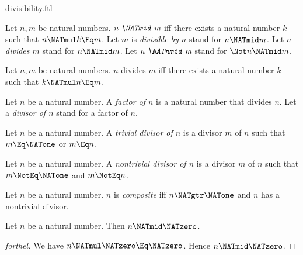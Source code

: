 \documentclass{stex}
\begin{document}
\begin{smodule}{divisibility.ftl}

\begin{definition}[forthel,for={divisible,divide}]
  Let $n, m$ be natural numbers.
  $\emph{n \NATmid m}$ iff there exists a natural number $k$ such that $n \NATmul k \Eq m$.
  Let $m$ is \emph{divisible by $n$} stand for $n \NATmid m$.
  Let $n$ \emph{divides $m$} stand for $n \NATmid m$.
  Let $\emph{n \NATnmid m}$ stand for $\Not n \NATmid m$.
\end{definition}

\begin{lemma}[forthel]
  Let $n, m$ be natural numbers.
  $n$ divides $m$ iff there exists a natural number $k$ such that $k \NATmul n \Eq m$.
\end{lemma}

\begin{definition}[forthel,for={factor,divisor}]
  Let $n$ be a natural number.
  A \emph{factor of $n$} is a natural number that divides $n$.
  Let a \emph{divisor of $n$} stand for a factor of $n$.
\end{definition}

\begin{definition}[forthel,for=trivial divisor]
  Let $n$ be a natural number.
  A \emph{trivial divisor of $n$} is a divisor $m$ of $n$ such that $m \Eq \NATone$ or $m \Eq n$.
\end{definition}

\begin{definition}[forthel,for=nontrivial divisor]
  Let $n$ be a natural number.
  A \emph{nontrivial divisor of $n$} is a divisor $m$ of $n$ such that $m \NotEq \NATone$ and $m \NotEq n$.
\end{definition}

\begin{definition}[forthel]
  Let $n$ be a natural number.
  $n$ is \emph{composite} iff $n \NATgtr \NATone$ and $n$ has a nontrivial divisor.
\end{definition}

\begin{proposition}[forthel]
  Let $n$ be a natural number.
  Then $n \NATmid \NATzero$.
\end{proposition}
\begin{proof}[forthel]
  We have $n \NATmul \NATzero \Eq \NATzero$.
  Hence $n \NATmid \NATzero$.
\end{proof}


\end{smodule}
\end{document}
